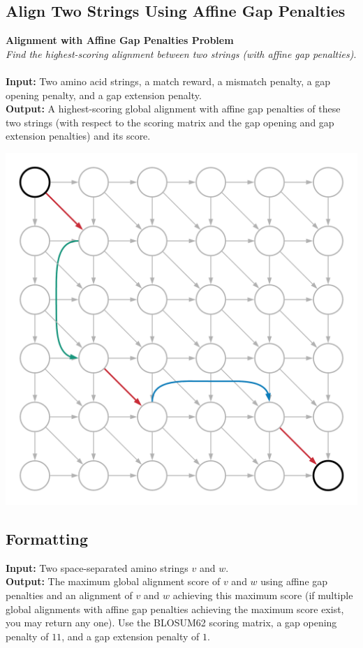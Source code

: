 \documentclass{article}
\begin{document}
\subsection{Align Two Strings Using Affine Gap Penalties}
\hline\vspace{5}
\textbf{Alignment with Affine Gap Penalties Problem}\\
\emph{Find the highest-scoring alignment between two strings (with affine gap penalties)}.\\ \\
\textbf{Input:} Two amino acid strings, a match reward, a mismatch penalty, a gap opening penalty, and a gap extension penalty.\\
\textbf{Output:} A highest-scoring global alignment with affine gap penalties of these two strings (with respect to the scoring matrix and the gap opening and gap extension penalties) and its score.
\begin{center}
    \includegraphics[scale=0.16]{c5/logos/5J.png}
\end{center}
\hline\vspace{5}

\subsection*{Formatting}
\noindent\textbf{Input:} Two space-separated amino strings $v$ and $w$.\\
\noindent\textbf{Output:} The maximum global alignment score of $v$ and $w$ using affine gap penalties and an alignment of $v$ and $w$ achieving this maximum score (if multiple global alignments with affine gap penalties achieving the maximum score exist, you may return any one). Use the BLOSUM62 scoring matrix, a gap opening penalty of $11$, and a gap extension penalty of $1$.
\end{document}
